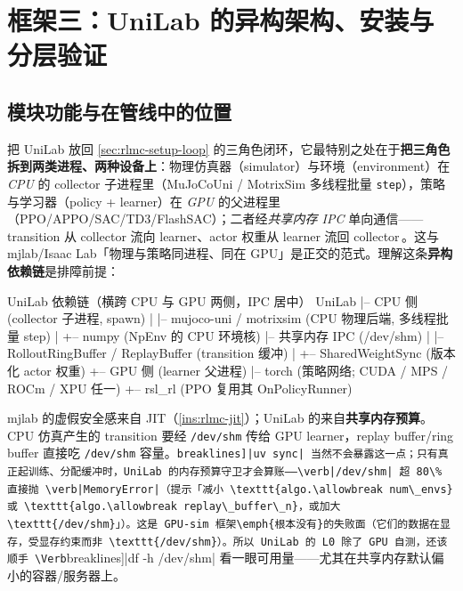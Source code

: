 \section{框架三：UniLab 的异构架构、安装与分层验证}
\label{sec:rlmc-setup-unilab}

\subsection{模块功能与在管线中的位置}

把 UniLab 放回 \cref{sec:rlmc-setup-loop} 的三角色闭环，它最特别之处在于\textbf{把三角色拆到两类进程、两种设备上}：物理仿真器（simulator）与环境（environment）在 \emph{CPU} 的 collector 子进程里（MuJoCoUni / MotrixSim 多线程批量 \verb|step|），策略与学习器（policy + learner）在 \emph{GPU} 的父进程里（PPO/APPO/SAC/TD3/FlashSAC）；二者经\emph{共享内存 IPC} 单向通信——transition 从 collector 流向 learner、actor 权重从 learner 流回 collector\,\cite{unilab2026}。这与 mjlab/Isaac Lab「物理与策略同进程、同在 GPU」是正交的范式。理解这条\textbf{异构依赖链}是排障前提：

\begin{codebox}[text]{UniLab 依赖链（横跨 CPU 与 GPU 两侧，IPC 居中）}
UniLab
  |-- CPU 侧 (collector 子进程, spawn)
  |     |-- mujoco-uni / motrixsim  (CPU 物理后端, 多线程批量 step)
  |     +-- numpy                   (NpEnv 的 CPU 环境核)
  |-- 共享内存 IPC (/dev/shm)
  |     |-- RolloutRingBuffer / ReplayBuffer  (transition 缓冲)
  |     +-- SharedWeightSync                  (版本化 actor 权重)
  +-- GPU 侧 (learner 父进程)
        |-- torch (策略网络; CUDA / MPS / ROCm / XPU 任一)
        +-- rsl_rl (PPO 复用其 OnPolicyRunner)
\end{codebox}

\begin{insight}\label{ins:rlmc-unilab-shm}
mjlab 的虚假安全感来自 JIT（\cref{ins:rlmc-jit}）；UniLab 的来自\textbf{共享内存预算}。CPU 仿真产生的 transition 要经 \verb|/dev/shm| 传给 GPU learner，replay buffer/ring buffer 直接吃 \verb|/dev/shm| 容量。\Verb[breaklines]|uv sync| 当然不会暴露这一点；只有真正起训练、分配缓冲时，UniLab 的内存预算守卫才会算账——\verb|/dev/shm| 超 80\% 直接抛 \verb|MemoryError|（提示「减小 \texttt{algo.\allowbreak num\_envs} 或 \texttt{algo.\allowbreak replay\_buffer\_n}，或加大 \texttt{/dev/shm}」）。这是 GPU-sim 框架\emph{根本没有}的失败面（它们的数据在显存，受显存约束而非 \texttt{/dev/shm}）。所以 UniLab 的 L0 除了 GPU 自测，还该顺手 \Verb[breaklines]|df -h /dev/shm| 看一眼可用量——尤其在共享内存默认偏小的容器/服务器上。
\end{insight}

